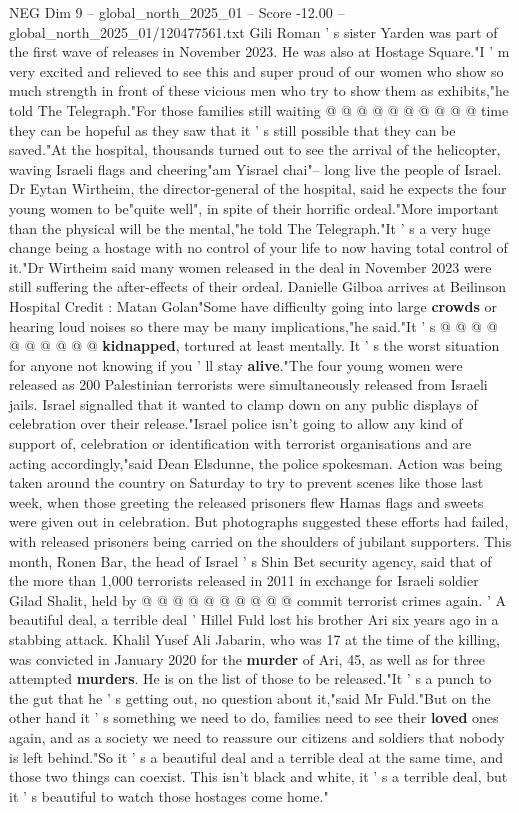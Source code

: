 \begin{textsample}{NEG Dim 9 – global\_north\_2025\_01 – Score -12.00 – global\_north\_2025\_01/120477561.txt}
Gili Roman ' s sister Yarden was part of the first wave of releases in November 2023.
He was also at Hostage Square."I ' m very excited and relieved to see this and super proud of our women who show so much strength in front of these vicious men who try to show them as exhibits,"he told The Telegraph."For those families still waiting @ @ @ @ @ @ @ @ @ @ time they can be hopeful as they saw that it ' s still possible that they can be saved."At the hospital, thousands turned out to see the arrival of the helicopter, waving Israeli flags and cheering"am Yisrael chai"-- long live the people of Israel.
Dr Eytan Wirtheim, the director-general of the hospital, said he expects the four young women to be"quite well", in spite of their horrific ordeal."More important than the physical will be the mental,"he told The Telegraph."It ' s a very huge change being a hostage with no control of your life to now having total control of it."Dr Wirtheim said many women released in the deal in November 2023 were still suffering the after-effects of their ordeal.
Danielle Gilboa arrives at Beilinson Hospital Credit : Matan Golan"Some have difficulty going into large \textbf{crowds} or hearing loud noises so there may be many implications,"he said."It ' s @ @ @ @ @ @ @ @ @ @ \textbf{kidnapped}, tortured at least mentally.
It ' s the worst situation for anyone not knowing if you ' ll stay \textbf{alive}."The four young women were released as 200 Palestinian terrorists were simultaneously released from Israeli jails.
Israel signalled that it wanted to clamp down on any public displays of celebration over their release."Israel police isn't going to allow any kind of support of, celebration or identification with terrorist organisations and are acting accordingly,"said Dean Elsdunne, the police spokesman.
Action was being taken around the country on Saturday to try to prevent scenes like those last week, when those greeting the released prisoners flew Hamas flags and sweets were given out in celebration.
But photographs suggested these efforts had failed, with released prisoners being carried on the shoulders of jubilant supporters.
This month, Ronen Bar, the head of Israel ' s Shin Bet security agency, said that of the more than 1,000 terrorists released in 2011 in exchange for Israeli soldier Gilad Shalit, held by @ @ @ @ @ @ @ @ @ @ commit terrorist crimes again. ' A beautiful deal, a terrible deal ' Hillel Fuld lost his brother Ari six years ago in a stabbing attack.
Khalil Yusef Ali Jabarin, who was 17 at the time of the killing, was convicted in January 2020 for the \textbf{murder} of Ari, 45, as well as for three attempted \textbf{murders}.
He is on the list of those to be released."It ' s a punch to the gut that he ' s getting out, no question about it,"said Mr Fuld."But on the other hand it ' s something we need to do, families need to see their \textbf{loved} ones again, and as a society we need to reassure our citizens and soldiers that nobody is left behind."So it ' s a beautiful deal and a terrible deal at the same time, and those two things can coexist.
This isn't black and white, it ' s a terrible deal, but it ' s beautiful to watch those hostages come home."


\end{textsample}
